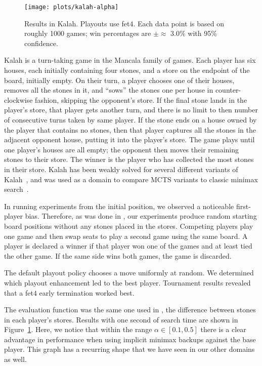 \documentclass{article}
\begin{document}
\begin{figure}[t!]
\begin{center}
\texttt{[image: plots/kalah-alpha]}
\caption{Results in Kalah. Playouts use fet$4$. Each data point is based on roughly 1000 
games; win percentages are $\pm \approx$ 3.0\% with 95\% confidence.}
\label{fig:kalah-alpha}
\end{center}
\end{figure}

Kalah is a turn-taking game in the Mancala family of games. Each player has six houses, each 
initially containing four stones, and a store on the endpoint of the board, initially empty. 
On their turn, a player chooses one of their houses, removes all the stones in it, and ``sows'' 
the stones one per house in counter-clockwise fashion, skipping the opponent's store. 
If the final stone lands in the player's store, that player gets another turn, and there is no 
limit to then number of consecutive turns taken by same player. If the stone ends on a house owned
by the player that contains no stones, then that player captures all the stones in the adjacent 
opponent house, putting it into the player's store. The game plays until one player's houses are
all empty; the opponent then moves their remaining stones to their store. The winner is the player
who has collected the most stones in their store. 
Kalah has been weakly solved for several different variants of Kalah~\cite{Irving00Solving}, 
and was used as a domain to compare MCTS variants to classic minimax search~\cite{Ramanujan11Tradeoffs}.

In running experiments from the initial position, we observed a noticeable first-player bias. Therefore, as
was done in \cite{Ramanujan11Tradeoffs}, our experiments produce random starting board positions 
without any stones placed in the stores. 
Competing players play one game and then swap seats to play a second game using the same board. A player 
is declared a winner if that player won one of the games and at least tied the other game. If the same side 
wins both games, the game is discarded. 

The default playout policy chooses a move uniformly at random. 
We determined which playout enhancement led to the best player. 
Tournament results revealed that a fet$4$ early termination worked best. 

The evaluation function was the same one used in \cite{Ramanujan11Tradeoffs}, the difference between stones
in each player's stores. Results with one 
second of search time are shown in Figure~\ref{fig:kalah-alpha}. 
Here, we notice that within the range $\alpha \in [0.1,0.5]$ there is a clear 
advantage in performance when using implicit minimax backups against the base player. 
This graph has a recurring shape that we have seen in our other domains as well. 
\end{document}
